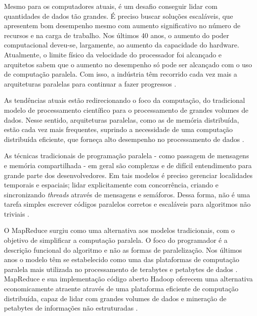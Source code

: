 Mesmo para os computadores atuais, é um desafio conseguir lidar com quantidades de dados tão grandes. É preciso buscar soluções escaláveis, que apresentem bom desempenho mesmo com aumento significativo no número de recursos e na carga de trabalho. 
Nos últimos 40 anos, o aumento do poder computacional deveu-se, largamente, ao aumento da capacidade do hardware. Atualmente, o limite físico da velocidade do processador foi alcançado e arquitetos sabem que o aumento no desempenho só pode ser alcançado com o uso de computação paralela. Com isso, a indústria têm recorrido cada vez mais a arquiteturas paralelas para continuar a fazer progressos \cite{Manferdelli:2008}. 

As tendências atuais estão redirecionando o foco da computação, do tradicional modelo de processamento científico para o processamento de grandes volumes de dados.
Nesse sentido, arquiteturas paralelas, como as de memória distribuída, estão cada vez mais frequentes, suprindo a necessidade de uma computação distribuída eficiente, que forneça alto desempenho no processamento de dados \cite{Bryant:2011}.



As técnicas tradicionais de programação paralela - como passagem de mensagens e memória compartilhada - em geral são complexas e de difícil entendimento para grande parte dos desenvolvedores. Em tais modelos é preciso gerenciar localidades temporais e espaciais; lidar explicitamente com concorrência, criando e sincronizando \textit{threads} através de mensagens e semáforos. Dessa forma, não é uma tarefa simples escrever códigos paralelos corretos e escaláveis para algoritmos não triviais \cite{Breshears:2009}.


O MapReduce surgiu como uma alternativa aos modelos tradicionais, com o objetivo de simplificar a computação paralela. 
O foco do programador é a descrição funcional do algoritmo e não as formas de paralelização. Nos últimos anos o modelo têm se estabelecido como uma das plataformas de computação paralela mais utilizada no processamento de terabytes e petabytes de dados \cite{Ranger:2007}.
MapReduce e sua implementação código aberto Hadoop oferecem  uma alternativa economicamente atraente através de uma plataforma eficiente de computação distribuída, capaz de lidar com grandes volumes de dados e mineração de petabytes de informações não estruturadas \cite{Cherkasova:2011}.

